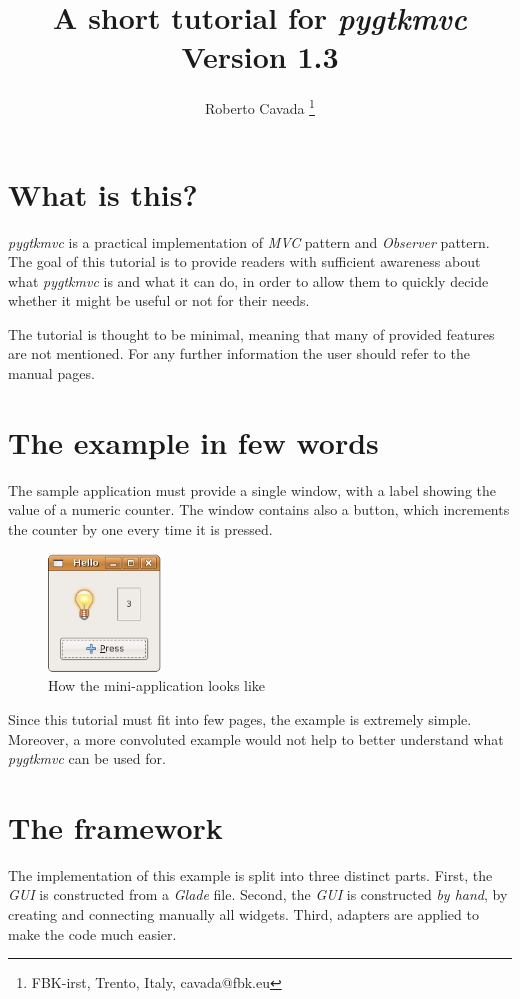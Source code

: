 \documentclass{article}
\newcommand{\kw}[1]{\emph{#1}\xspace}
\newcommand{\appl}[1]{\textsl{#1}\xspace}
\newcommand{\glade}{\appl{Glade}}
\newcommand{\mvc}{\kw{MVC} pattern\xspace}
\newcommand{\obs}{\kw{Observer} pattern\xspace}
\newcommand{\gui}{\kw{GUI}}
\newcommand{\pygtkmvc}{\kw{pygtkmvc}}
\begin{document}
\title{A short tutorial for \pygtkmvc\\
Version 1.3}

\author{ Roberto Cavada \thanks{FBK-irst, Trento, Italy,
 cavada@fbk.eu} }

\maketitle

\tableofcontents
\newpage

\section{What is this?}
\pygtkmvc is a practical implementation of \mvc and \obs. The goal of
this tutorial is to provide readers with sufficient awareness about
what \pygtkmvc is and what it can do, in order to allow them to
quickly decide whether it might be useful or not for their needs.

The tutorial is thought to be minimal, meaning that many of provided
features are not mentioned. For any further information the user
should refer to the manual pages.


\section{The example in few words}
The sample application must provide a single window, with a label
showing the value of a numeric counter. The window contains also a
button, which increments the counter by one every time it is pressed.

\begin{figure}[htbp]
\begin{center}
\includegraphics[width=3cm]{eps/appl}
\caption{How the mini-application looks like}
\end{center}
\end{figure}


Since this tutorial must fit into few pages, the example is extremely
simple. Moreover, a more convoluted example would not help to better
understand what \pygtkmvc can be used for.


\section{The framework}
The implementation of this example is split into three distinct
parts. First, the \gui is constructed from a \glade file. Second,
the \gui is constructed \emph{by hand}, by creating and connecting
manually all widgets. Third, adapters are applied to make the code
much easier.
\end{document}
